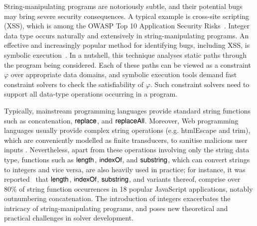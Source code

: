 

String-manipulating programs are notoriously subtle, and their potential bugs %
may bring severe security consequences. A typical example is cross-site scripting
(XSS), which is among the OWASP Top 10 Application Security Risks~\cite{owasp17}.
Integer data type occurs naturally and extensively in string-manipulating programs. %
%
An effective and increasingly popular method for identifying bugs, including XSS, is symbolic execution~\cite{symbex-survey}.
In a nutshell, this technique analyses static paths
 through the program being considered.
Each of these paths can be viewed as a constraint~$\varphi$ over
appropriate data domains, and symbolic execution tools
demand fast constraint
solvers to check the satisfiability of $\varphi$. Such constraint
solvers need to support all %
data-type operations occurring in
a program.


Typically, mainstream programming languages provide standard string functions such as concatenation, $\mathsf{replace}$, and $\mathsf{replaceAll}$. Moreover, Web programming languages usually provide complex string operations (e.g. htmlEscape and trim), which are conveniently modelled as finite transducers, to sanitise malicious user inputs \cite{BEK}. 
Nevertheless, apart from these operations involving only the string data type, functions such as $\mathsf{length}$, $\mathsf{indexOf}$, and $\mathsf{substring}$, which can convert strings to integers and vice versa, are also heavily used in practice; for instance, it was reported~\cite{Berkeley-JavaScript} that $\mathsf{length}$, $\mathsf{indexOf}$, $\mathsf{substring}$, and variants thereof, comprise over 80\% of string function occurrences in 18 popular JavaScript applications, notably outnumbering concatenation. The introduction of integers exacerbates the intricacy of string-manipulating programs, and poses new theoretical and practical challenges in solver development. 

